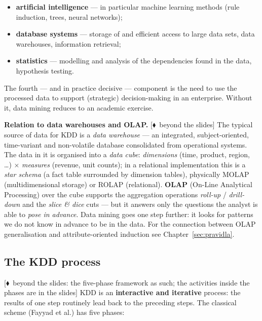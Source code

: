 \documentclass[11pt,a4paper]{article}
\theoremstyle{definition}
\newcommand{\mimo}{\textcolor{markcol}{\textsf{\footnotesize[$\blacklozenge$~beyond the slides]}}}
\newcommand{\mimoq}[1]{\textcolor{markcol}{\textsf{\footnotesize[$\blacklozenge$~beyond the slides: #1]}}}
\begin{document}
\begin{itemize}
\item \textbf{artificial intelligence} --- in particular machine learning methods (rule
      induction, trees, neural networks);
\item \textbf{database systems} --- storage of and efficient access to large data sets, data
      warehouses, information retrieval;
\item \textbf{statistics} --- modelling and analysis of the dependencies found in the data,
      hypothesis testing.
\end{itemize}

The fourth --- and in practice decisive --- component is the need to use the processed data to
support (strategic) decision-making in an enterprise. Without it, data mining reduces
to an academic exercise.

\textbf{Relation to data warehouses and OLAP.} \mimo{} The typical source of data for KDD is a
\emph{data warehouse} --- an integrated, subject-oriented, time-variant and non-volatile
database consolidated from operational systems. The data in it is organised into a \emph{data
cube}: \emph{dimensions} (time, product, region, \dots) $\times$ \emph{measures} (revenue, unit
counts); in a relational implementation this is a \emph{star schema} (a fact table surrounded
by dimension tables), physically MOLAP (multidimensional storage) or ROLAP (relational).
\textbf{OLAP} (On-Line Analytical Processing) over the cube supports the aggregation operations
\emph{roll-up} / \emph{drill-down} and the \emph{slice \& dice} cuts --- but it answers only the
questions the analyst is able to \emph{pose in advance}. Data mining goes one step
further: it looks for patterns we do not know in advance to be in the data. For the connection
between OLAP generalisation and attribute-oriented induction see
Chapter~\ref{sec:pravidla}.

\subsection{The KDD process}

\mimoq{the five-phase framework as such; the activities inside the phases are in the slides}
KDD is an \textbf{interactive and iterative} process: the results of
one step routinely lead back to the preceding steps. The classical scheme (Fayyad et al.) has
five phases:
\end{document}
